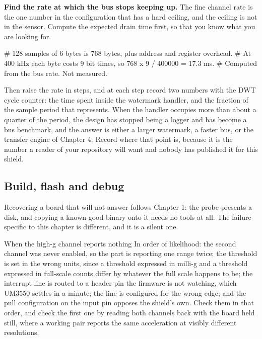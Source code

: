 \begin{steps}
\item \textbf{Find the rate at which the bus stops keeping up.} The fine channel
rate is the one number in the configuration that has a hard ceiling, and the
ceiling is not in the sensor. Compute the expected drain time first, so that you
know what you are looking for.
\begin{shellcode}
# 128 samples of 6 bytes is 768 bytes, plus address and register overhead.
# At 400 kHz each byte costs 9 bit times, so 768 x 9 / 400000 = 17.3 ms.
# Computed from the bus rate. Not measured.
\end{shellcode}
Then raise the rate in steps, and at each step record two numbers with the DWT
cycle counter: the time spent inside the watermark handler, and the fraction of
the sample period that represents. When the handler occupies more than about a
quarter of the period, the design has stopped being a logger and has become a
bus benchmark, and the answer is either a larger watermark, a faster bus, or the
transfer engine of Chapter 4. Record where that point is, because it is the
number a reader of your repository will want and nobody has published it for
this shield.
\end{steps}

\subsection*{Build, flash and debug}



Recovering a board that will not answer follows Chapter 1: the probe presents a
disk, and copying a known-good binary onto it needs no tools at all. The failure
specific to this chapter is different, and it is a silent one.

\begin{note}{When the high-g channel reports nothing}
In order of likelihood: the second channel was never enabled, so the part is
reporting one range twice; the threshold is set in the wrong units, since a
threshold expressed in milli-g and a threshold expressed in full-scale counts
differ by whatever the full scale happens to be; the interrupt line is routed to
a header pin the firmware is not watching, which UM3550 settles in a minute; the
line is configured for the wrong edge; and the pull configuration on the input
pin opposes the shield's own. Check them in that order, and check the first one
by reading both channels back with the board held still, where a working pair
reports the same acceleration at visibly different resolutions.
\end{note}

